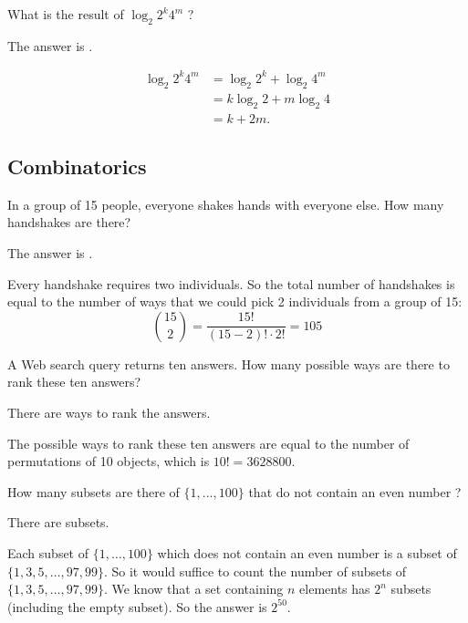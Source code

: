 \documentclass{ximera}
\begin{document}
\begin{question}
What is  the result of  $\log_2 2^k 4^m$  ? 
\begin{solution}
The answer is .
\end{solution}
\begin{align*}
\log_2{2^k 4^m} &= \log_2{2^k} + \log_2{4^m} \\
&= k \log_2{2} + m \log_2{4} \\
&= k + 2m.
\end{align*}
\end{question}

\subsection*{Combinatorics}

\begin{question}
In a group of 15 people, everyone shakes hands with everyone else.  How many handshakes are there? 
\begin{solution}
The answer is .
\end{solution}
Every handshake requires two individuals. So the total number of handshakes is equal to the number of ways that we could pick 2 individuals from a group of 15:
\[
\binom{15}{2} = \frac{15!}{(15 - 2)! \cdot 2!} = 105
\]
\end{question}

\begin{question}
A Web search query returns ten answers. How many possible ways are there to rank these ten answers?
\begin{solution}
There are  ways to rank the answers.
\end{solution}
The possible ways to rank these ten answers are equal to the number of permutations of 10 objects, which is $10! = 3628800$.
\end{question}

\begin{question}
How many subsets are there of $\{1, ... , 100\}$ that do not contain an even number ? 
\begin{solution}
There are  subsets.
\end{solution}
Each subset of $\{1 , \ldots , 100\}$ which does not contain an even number is a subset of $\{1, 3, 5, \ldots , 97, 99\}$. So it would suffice to count the number of subsets of $\{1, 3, 5, \ldots , 97, 99\}$. We know that a set containing $n$ elements has $2^n$ subsets (including the empty subset). So the answer is $2^{50}$.
\end{question}
\end{document}
